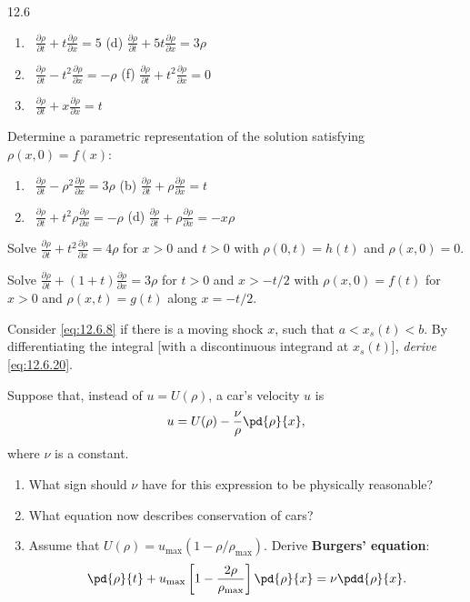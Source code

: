 \begin{exercises}{12.6}
\begin{enumerate}
\item[(c)]\starred\ $\frac{\partial\rho}{\partial t} + t\frac{\partial\rho}{\partial x} = 5$ \hfill (d) $\frac{\partial\rho}{\partial t} + 5t\frac{\partial\rho}{\partial x} = 3\rho$

\item[(e)]\starred\ $\frac{\partial\rho}{\partial t} - t^2\frac{\partial\rho}{\partial x} = -\rho$ \hfill (f) $\frac{\partial\rho}{\partial t} + t^2\frac{\partial\rho}{\partial x} = 0$

\item[(g)]\starred\ $\frac{\partial\rho}{\partial t} + x\frac{\partial\rho}{\partial x} = t$
\end{enumerate}

\item \label{ex:12.6.9}
Determine a parametric representation of the solution satisfying $\rho(x,0) = f(x)$:
\begin{enumerate}
\item[(a)]\starred\ $\frac{\partial\rho}{\partial t} - \rho^2\frac{\partial\rho}{\partial x} = 3\rho$ \hfill (b) $\frac{\partial\rho}{\partial t} + \rho\frac{\partial\rho}{\partial x} = t$

\item[(c)]\starred\ $\frac{\partial\rho}{\partial t} + t^2\rho\frac{\partial\rho}{\partial x} = -\rho$ \hfill (d) $\frac{\partial\rho}{\partial t} + \rho\frac{\partial\rho}{\partial x} = -x\rho$
\end{enumerate}

\item \label{ex:12.6.10}
Solve $\frac{\partial\rho}{\partial t} + t^2\frac{\partial\rho}{\partial x} = 4\rho$ for $x > 0$ and $t > 0$ with $\rho(0,t) = h(t)$ and $\rho(x,0) = 0$.

\item \label{ex:12.6.11}
Solve $\frac{\partial\rho}{\partial t} + (1+t)\frac{\partial\rho}{\partial x} = 3\rho$ for $t > 0$ and $x > -t/2$ with $\rho(x,0) = f(t)$ for $x > 0$ and $\rho(x,t) = g(t)$ along $x = -t/2$.

\item \label{ex:12.6.12}
Consider \eqref{eq:12.6.8} if there is a moving shock $x$, such that $a < x_s(t) < b$.  By differentiating the integral [with a discontinuous integrand at $x_s(t)$], \emph{derive} \eqref{eq:12.6.20}.

\item \label{ex:12.6.13}
Suppose that, instead of $u = U(\rho)$, a car's velocity $u$ is
\[
u = U(\rho) - \frac{\nu}{\rho}\pd{\rho}{x},
\]
where $\nu$ is a constant.
\begin{enumerate}
\item[(a)] What sign should $\nu$ have for this expression to be physically reasonable?
\item[(b)] What equation now describes conservation of cars?
\item[(c)] Assume that $U(\rho) = u_{\max}(1 - \rho/\rho_{\max})$.  Derive \textbf{Burgers' equation}:
\[
\pd{\rho}{t} + u_{\max}\left[1 - \frac{2\rho}{\rho_{\max}}\right]\pd{\rho}{x} = \nu\pdd{\rho}{x}.
\]
\end{enumerate}


\end{exercises}
